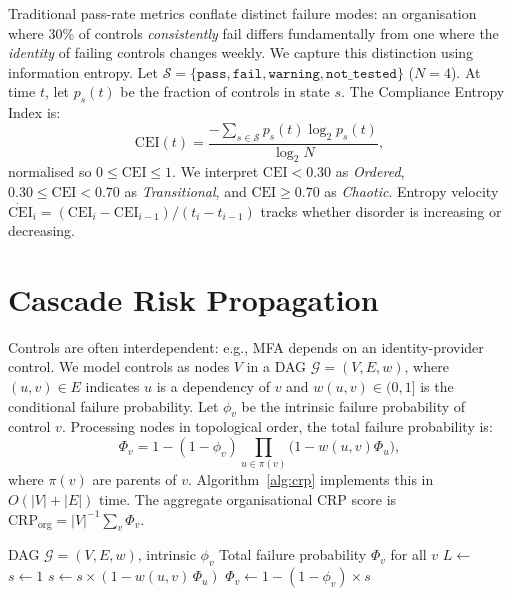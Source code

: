\documentclass[conference]{IEEEtran}
\newcommand{\CEI}{\mathrm{CEI}}
\newcommand{\CRP}{\mathrm{CRP}}
\begin{document}
Traditional pass-rate metrics conflate distinct failure modes: an organisation where 30\% of controls \emph{consistently} fail differs fundamentally from one where the \emph{identity} of failing controls changes weekly. We capture this distinction using information entropy. Let $\mathcal{S} = \{\texttt{pass}, \texttt{fail}, \texttt{warning}, \texttt{not\_tested}\}$ ($N{=}4$). At time $t$, let $p_s(t)$ be the fraction of controls in state $s$. The Compliance Entropy Index is:
\begin{equation}
  \CEI(t) = \frac{-\sum_{s \in \mathcal{S}} p_s(t) \log_2 p_s(t)}{\log_2 N},
  \label{eq:cei}
\end{equation}
normalised so $0\le \CEI \le 1$. We interpret $\CEI<0.30$ as \emph{Ordered}, $0.30\le\CEI<0.70$ as \emph{Transitional}, and $\CEI\ge0.70$ as \emph{Chaotic}. Entropy velocity $\dot{\CEI}_i = (\CEI_i - \CEI_{i-1})/(t_i - t_{i-1})$ tracks whether disorder is increasing or decreasing.

\section{Cascade Risk Propagation}
\label{sec:crp}

Controls are often interdependent: e.g., MFA depends on an identity-provider control. We model controls as nodes $V$ in a DAG $\mathcal{G}=(V,E,w)$, where $(u,v)\in E$ indicates $u$ is a dependency of $v$ and $w(u,v)\in(0,1]$ is the conditional failure probability. Let $\phi_v$ be the intrinsic failure probability of control $v$. Processing nodes in topological order, the total failure probability is:
\begin{equation}
  \Phi_v = 1 - (1 - \phi_v)\prod_{u \in \pi(v)}\bigl(1 - w(u,v)\Phi_u\bigr),
  \label{eq:crp}
\end{equation}
where $\pi(v)$ are parents of $v$. Algorithm~\ref{alg:crp} implements this in $O(|V|+|E|)$ time. The aggregate organisational CRP score is $\CRP_{\text{org}} = |V|^{-1}\sum_{v}\Phi_v$.

\begin{algorithm}[h]
  \caption{Cascade Risk Propagation}
  \label{alg:crp}
  \begin{algorithmic}[1]
    \Require DAG $\mathcal{G}=(V,E,w)$, intrinsic $\phi_v$
    \Ensure Total failure probability $\Phi_v$ for all $v$
    \State $L \leftarrow$ 
      \State $s \leftarrow 1$
        \State $s \leftarrow s \times (1 - w(u,v)\,\Phi_u)$
      \EndFor
      \State $\Phi_v \leftarrow 1 - (1 - \phi_v)\times s$
    \EndFor
  \end{algorithmic}
\end{algorithm}
\end{document}

